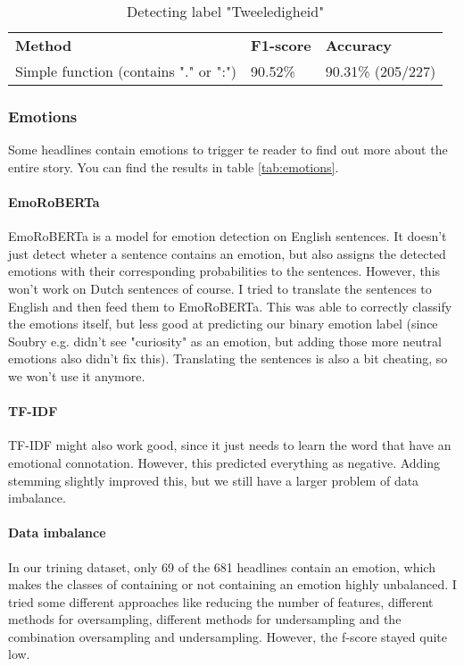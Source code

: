 \documentclass{article}
\begin{document}
\begin{table}
\begin{tabular}{lll}
\textbf{Method}                          & \textbf{F1-score} & \textbf{Accuracy} \\
Simple function (contains "." or ":") & 90.52\%           & 90.31\% (205/227)
\end{tabular}
\caption{Detecting label "Tweeledigheid"}
\label{tab:duality}
\end{table}

\subsubsection{Emotions}
Some headlines contain emotions to trigger te reader to find out more about the entire story. \cite{soubry} You can find the results in table \ref{tab:emotions}.

\paragraph{EmoRoBERTa} EmoRoBERTa is a model for emotion detection on English sentences. It doesn't just detect wheter a sentence contains an emotion, but also assigns the detected emotions with their corresponding probabilities to the sentences. However, this won't work on Dutch sentences of course. I tried to translate the sentences to English and then feed them to EmoRoBERTa. This was able to correctly classify the emotions itself, but less good at predicting our binary emotion label (since Soubry e.g. didn't see "curiosity" as an emotion, but adding those more neutral emotions also didn't fix this). Translating the sentences is also a bit cheating, so we won't use it anymore.

\paragraph{TF-IDF} TF-IDF might also work good, since it just needs to learn the word that have an emotional connotation. However, this predicted everything as negative. Adding stemming slightly improved this, but we still have a larger problem of data imbalance.

\paragraph{Data imbalance} In our trining dataset, only 69 of the 681 headlines contain an emotion, which makes the classes of containing or not containing an emotion highly unbalanced. I tried some different approaches like reducing the number of features, different methods for oversampling, different methods for undersampling and the combination oversampling and undersampling. However, the f-score stayed quite low.
\end{document}
